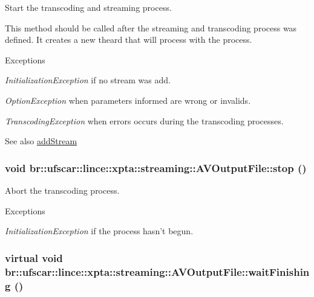 Start the transcoding and streaming process. 

This method should be called after the streaming and transcoding process was defined. It creates a new theard that will process with the process. 
\begin{DoxyExceptions}{Exceptions}
\item[{\em InitializationException}]if no stream was add. \item[{\em OptionException}]when parameters informed are wrong or invalids. \item[{\em TranscodingException}]when errors occurs during the transcoding processes. \end{DoxyExceptions}
\begin{DoxySeeAlso}{See also}
\hyperlink{classbr_1_1ufscar_1_1lince_1_1xpta_1_1streaming_1_1AVOutputFile_aadb51cfcc435317a17e61cf23823bcef}{addStream} 
\end{DoxySeeAlso}
\hypertarget{classbr_1_1ufscar_1_1lince_1_1xpta_1_1streaming_1_1AVOutputFile_ae243b5d1d810fb2a12aabf42fa4d493b}{
\subsubsection[{stop}]{\setlength{\rightskip}{0pt plus 5cm}void br::ufscar::lince::xpta::streaming::AVOutputFile::stop ()}}
\label{classbr_1_1ufscar_1_1lince_1_1xpta_1_1streaming_1_1AVOutputFile_ae243b5d1d810fb2a12aabf42fa4d493b}


Abort the transcoding process. 


\begin{DoxyExceptions}{Exceptions}
\item[{\em InitializationException}]if the process hasn't begun. \end{DoxyExceptions}
\hypertarget{classbr_1_1ufscar_1_1lince_1_1xpta_1_1streaming_1_1AVOutputFile_a488643d156229813598cc413cc63a920}{
\subsubsection[{waitFinishing}]{\setlength{\rightskip}{0pt plus 5cm}virtual void br::ufscar::lince::xpta::streaming::AVOutputFile::waitFinishing ()}}
\label{classbr_1_1ufscar_1_1lince_1_1xpta_1_1streaming_1_1AVOutputFile_a488643d156229813598cc413cc63a920}


